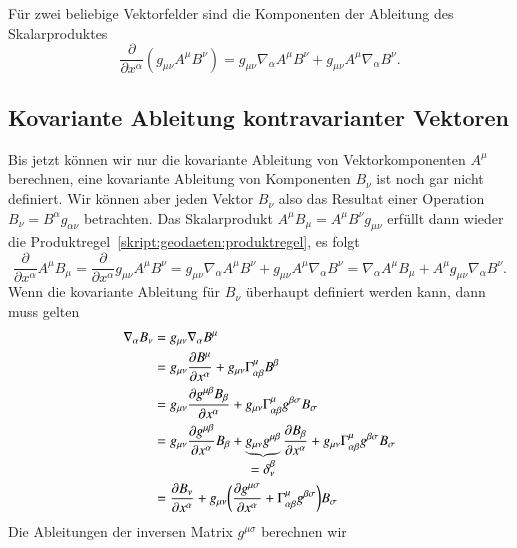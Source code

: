\begin{satz}
Für zwei beliebige Vektorfelder sind die Komponenten der Ableitung
des Skalarproduktes 
\begin{equation}
\frac{\partial}{\partial x^\alpha}
(g_{\mu\nu}A^\mu B^\nu)
=
g_{\mu\nu}\nabla_\alpha A^\mu B^\nu
+
g_{\mu\nu}A^\mu\nabla_\alpha B^\nu.
\label{skript:geodaeten:produktregel}
\end{equation}
\end{satz}

\subsection{Kovariante Ableitung kontravarianter Vektoren}
Bis jetzt können wir nur die kovariante Ableitung von Vektorkomponenten
$A^\mu$ berechnen, eine kovariante Ableitung von Komponenten $B_\nu$
ist noch gar nicht definiert.
Wir können aber jeden Vektor $B_\nu$ also das Resultat einer Operation
$B_\nu=B^\alpha g_{\alpha\nu}$ betrachten.
Das Skalarprodukt $A^\mu B_\mu=A^\mu B^\nu g_{\mu\nu}$ erfüllt dann
wieder die Produktregel~\eqref{skript:geodaeten:produktregel},
es folgt
\[
\frac{\partial}{\partial x^\alpha}A^\mu B_\mu
=
\frac{\partial}{\partial x^\alpha}g_{\mu\nu} A^\mu B^\nu
=
g_{\mu\nu} \nabla_\alpha A^\mu B^\nu
+
g_{\mu\nu} A^\mu \nabla_\alpha B^\nu
=
\nabla_\alpha A^\mu B_\mu
+
A^\mu g_{\mu\nu} \nabla_\alpha B^\nu.
\]
Wenn die kovariante Ableitung für $B_\nu$ überhaupt definiert werden 
kann, dann muss gelten
\begin{align}
\nabla_\alpha B_\nu
&=
g_{\mu\nu}\nabla_\alpha B^\mu
\notag
\\
&=
g_{\mu\nu}\frac{\partial B^\mu}{\partial x^\alpha}
+
g_{\mu\nu}\Gamma^\mu_{\alpha\beta}B^\beta
\notag
\\
&=
g_{\mu\nu}\frac{\partial g^{\mu\beta}B_\beta}{\partial x^\alpha}
+
g_{\mu\nu}\Gamma^\mu_{\alpha\beta}g^{\beta\sigma}B_\sigma
\notag
\\
&=
g_{\mu\nu}\frac{\partial g^{\mu\beta}}{\partial x^\alpha} B_\beta
+
\underbrace{g_{\mu\nu}g^{\mu\beta}}_{\displaystyle=\delta_\nu^\beta}\frac{\partial B_\beta}{\partial x^\alpha}
+
g_{\mu\nu}\Gamma^\mu_{\alpha\beta}g^{\beta\sigma}B_\sigma
\notag
\\
&=
\frac{\partial B_\nu}{\partial x^\alpha}
+
g_{\mu\nu}\biggl(
\frac{\partial g^{\mu\sigma}}{\partial x^\alpha}
+\Gamma^\mu_{\alpha\beta}g^{\beta\sigma}
\biggr)B_\sigma
\label{skript:geodaeten:kovkov1}
\end{align}
Die Ableitungen der inversen Matrix $g^{\mu\sigma}$ berechnen wir
